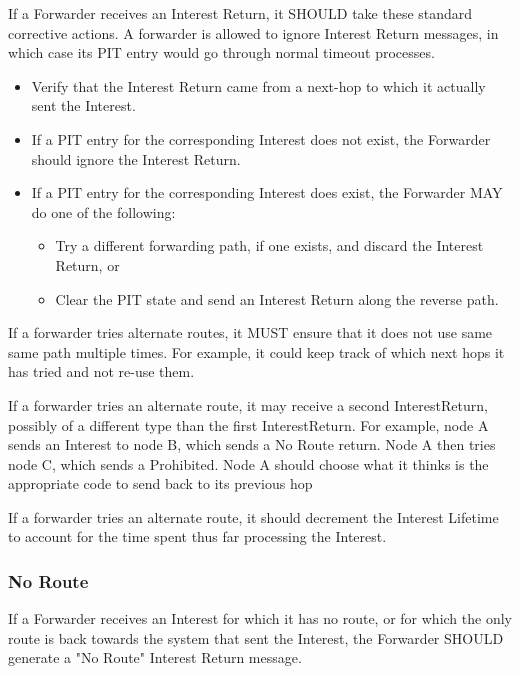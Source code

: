 \documentclass[12pt]{article}
\begin{document}
If a Forwarder receives an Interest Return, it SHOULD take these
standard corrective actions.  A forwarder is allowed to ignore
Interest Return messages, in which case its PIT entry would go
through normal timeout processes.

\begin{itemize}
\item  Verify that the Interest Return came from a next-hop to which it
   actually sent the Interest.

\item  If a PIT entry for the corresponding Interest does not exist, the
   Forwarder should ignore the Interest Return.

\item  If a PIT entry for the corresponding Interest does exist, the
   Forwarder MAY do one of the following:
\begin{itemize}
   \item  Try a different forwarding path, if one exists, and discard the
      Interest Return, or

   \item Clear the PIT state and send an Interest Return along the
      reverse path.
\end{itemize}
\end{itemize}

If a forwarder tries alternate routes, it MUST ensure that it does
not use same same path multiple times.  For example, it could keep
track of which next hops it has tried and not re-use them.

If a forwarder tries an alternate route, it may receive a second
InterestReturn, possibly of a different type than the first
InterestReturn.  For example, node A sends an Interest to node B,
which sends a No Route return.  Node A then tries node C, which sends
a Prohibited.  Node A should choose what it thinks is the appropriate
code to send back to its previous hop

If a forwarder tries an alternate route, it should decrement the
Interest Lifetime to account for the time spent thus far processing
the Interest.

\subsubsection{No Route}
If a Forwarder receives an Interest for which it has no route, or for
which the only route is back towards the system that sent the
Interest, the Forwarder SHOULD generate a "No Route" Interest Return
message.
\end{document}
